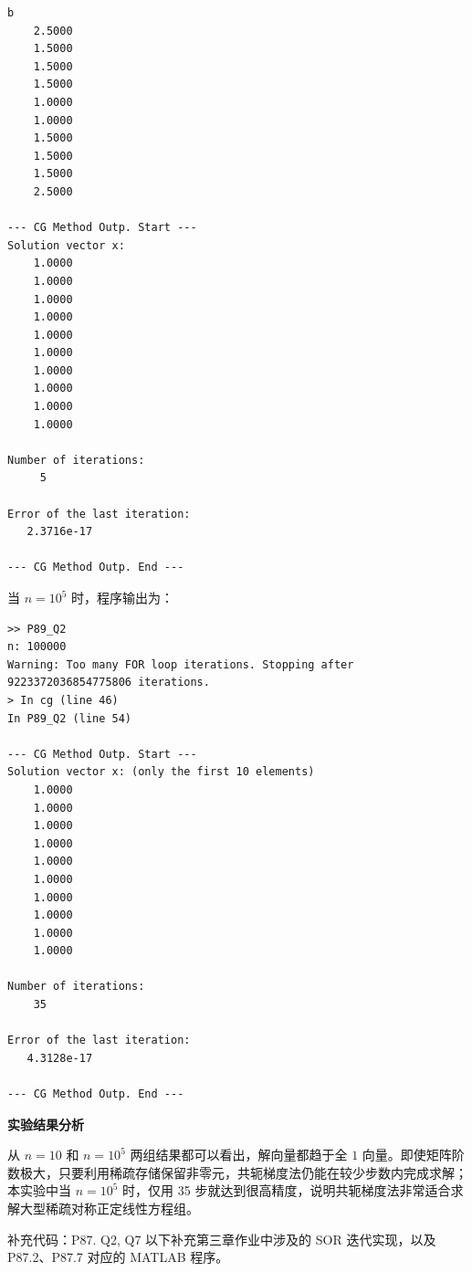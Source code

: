 \documentclass[11pt, a4paper]{ctexart}
\begin{document}
\begin{solution}
\begin{lstlisting}
b
    2.5000
    1.5000
    1.5000
    1.5000
    1.0000
    1.0000
    1.5000
    1.5000
    1.5000
    2.5000

--- CG Method Outp. Start ---
Solution vector x:
    1.0000
    1.0000
    1.0000
    1.0000
    1.0000
    1.0000
    1.0000
    1.0000
    1.0000
    1.0000

Number of iterations:
     5

Error of the last iteration:
   2.3716e-17

--- CG Method Outp. End ---
\end{lstlisting}

    当 $n=10^5$ 时，程序输出为：

\begin{lstlisting}
>> P89_Q2
n: 100000
Warning: Too many FOR loop iterations. Stopping after 9223372036854775806 iterations.
> In cg (line 46)
In P89_Q2 (line 54)

--- CG Method Outp. Start ---
Solution vector x: (only the first 10 elements)
    1.0000
    1.0000
    1.0000
    1.0000
    1.0000
    1.0000
    1.0000
    1.0000
    1.0000
    1.0000

Number of iterations:
    35

Error of the last iteration:
   4.3128e-17

--- CG Method Outp. End ---
\end{lstlisting}

    \textbf{实验结果分析}

    从 $n=10$ 和 $n=10^5$ 两组结果都可以看出，解向量都趋于全 $1$ 向量。即使矩阵阶数极大，只要利用稀疏存储保留非零元，共轭梯度法仍能在较少步数内完成求解；本实验中当 $n=10^5$ 时，仅用 35 步就达到很高精度，说明共轭梯度法非常适合求解大型稀疏对称正定线性方程组。
\end{solution}


\begin{problem}{补充代码：P87. Q2, Q7}
    以下补充第三章作业中涉及的 SOR 迭代实现，以及 P87.2、P87.7 对应的 MATLAB 程序。
\end{problem}
\end{document}
